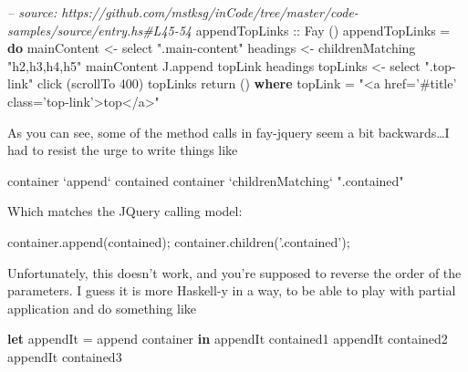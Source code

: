 \documentclass[]{article}
\newenvironment{Shaded}{}{}
\newcommand{\KeywordTok}[1]{\textcolor[rgb]{0.00,0.44,0.13}{\textbf{{#1}}}}
\newcommand{\DataTypeTok}[1]{\textcolor[rgb]{0.56,0.13,0.00}{{#1}}}
\newcommand{\DecValTok}[1]{\textcolor[rgb]{0.25,0.63,0.44}{{#1}}}
\newcommand{\StringTok}[1]{\textcolor[rgb]{0.25,0.44,0.63}{{#1}}}
\newcommand{\CommentTok}[1]{\textcolor[rgb]{0.38,0.63,0.69}{\textit{{#1}}}}
\newcommand{\OtherTok}[1]{\textcolor[rgb]{0.00,0.44,0.13}{{#1}}}
\newcommand{\FunctionTok}[1]{\textcolor[rgb]{0.02,0.16,0.49}{{#1}}}
\newcommand{\VariableTok}[1]{\textcolor[rgb]{0.10,0.09,0.49}{{#1}}}
\newcommand{\OperatorTok}[1]{\textcolor[rgb]{0.40,0.40,0.40}{{#1}}}
\newcommand{\AttributeTok}[1]{\textcolor[rgb]{0.49,0.56,0.16}{{#1}}}
\newcommand{\NormalTok}[1]{{#1}}
\begin{document}
\begin{Shaded}
\begin{Highlighting}[]
\CommentTok{-- source: https://github.com/mstksg/inCode/tree/master/code-samples/source/entry.hs#L45-54}
\OtherTok{appendTopLinks ::} \DataTypeTok{Fay} \NormalTok{()}
\NormalTok{appendTopLinks }\FunctionTok{=} \KeywordTok{do}
  \NormalTok{mainContent }\OtherTok{<-} \NormalTok{select }\StringTok{".main-content"}
  \NormalTok{headings }\OtherTok{<-} \NormalTok{childrenMatching }\StringTok{"h2,h3,h4,h5"} \NormalTok{mainContent}
  \NormalTok{J.append topLink headings}
  \NormalTok{topLinks }\OtherTok{<-} \NormalTok{select }\StringTok{".top-link"}
  \NormalTok{click (scrollTo }\DecValTok{400}\NormalTok{) topLinks}
  \NormalTok{return ()}
  \KeywordTok{where}
    \NormalTok{topLink }\FunctionTok{=} \StringTok{"<a href='#title' class='top-link'>top</a>"}
\end{Highlighting}
\end{Shaded}

As you can see, some of the method calls in fay-jquery seem a bit
backwards\ldots{}I had to resist the urge to write things like

\begin{Shaded}
\begin{Highlighting}[]
\NormalTok{container }\OtherTok{`append`} \NormalTok{contained}
\NormalTok{container }\OtherTok{`childrenMatching`} \StringTok{".contained"}
\end{Highlighting}
\end{Shaded}

Which matches the JQuery calling model:

\begin{Shaded}
\begin{Highlighting}[]
\VariableTok{container}\NormalTok{.}\AttributeTok{append}\NormalTok{(contained)}\OperatorTok{;}
\VariableTok{container}\NormalTok{.}\AttributeTok{children}\NormalTok{(}\StringTok{'.contained'}\NormalTok{)}\OperatorTok{;}
\end{Highlighting}
\end{Shaded}

Unfortunately, this doesn't work, and you're supposed to reverse the
order of the parameters. I guess it is more Haskell-y in a way, to be
able to play with partial application and do something like

\begin{Shaded}
\begin{Highlighting}[]
\KeywordTok{let}
  \NormalTok{appendIt }\FunctionTok{=} \NormalTok{append container}
\KeywordTok{in}
  \NormalTok{appendIt contained1}
  \NormalTok{appendIt contained2}
  \NormalTok{appendIt contained3}
\end{Highlighting}
\end{Shaded}
\end{document}
